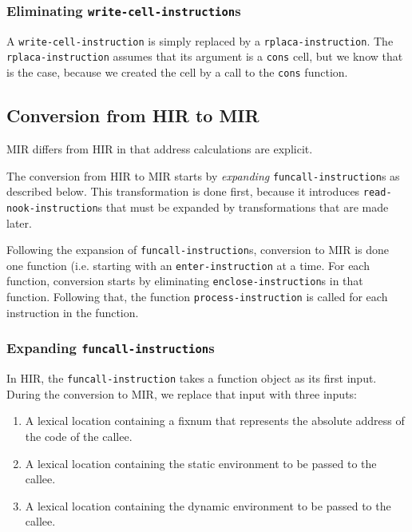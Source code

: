 \subsubsection{Eliminating \texttt{write-cell-instruction}s}

A \texttt{write-cell-instruction} is simply replaced by a
\texttt{rplaca-instruction}.  The \texttt{rplaca-instruction} assumes
that its argument is a \texttt{cons} cell, but we know that is the
case, because we created the cell by a call to the \texttt{cons}
function.

\subsection{Conversion from HIR to MIR}

MIR differs from HIR in that address calculations are explicit.

The conversion from HIR to MIR starts by \emph{expanding}
\texttt{funcall-instruction}s as described below.  This transformation
is done first, because it introduces \texttt{read-nook-instruction}s
that must be expanded by transformations that are made later.

Following the expansion of \texttt{funcall-instruction}s, conversion
to MIR is done one function (i.e. starting with an
\texttt{enter-instruction} at a time.  For each function, conversion
starts by eliminating \texttt{enclose-instruction}s in that function.
Following that, the function \texttt{process-instruction} is called
for each instruction in the function.

\subsubsection{Expanding \texttt{funcall-instruction}s}

In HIR, the \texttt{funcall-instruction} takes a function object as
its first input.  During the conversion to MIR, we replace that input
with three inputs:

\begin{enumerate}
\item A lexical location containing a fixnum that represents the
  absolute address of the code of the callee.
\item A lexical location containing the static environment to be
  passed to the callee.
\item A lexical location containing the dynamic environment to be
  passed to the callee.
\end{enumerate}

